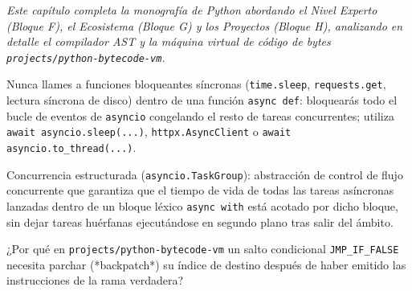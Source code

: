 \documentclass{book}
\begin{document}
\noindent\textit{Este capítulo completa la monografía de Python abordando el Nivel Experto (Bloque F), el Ecosistema (Bloque G) y los Proyectos (Bloque H), analizando en detalle el compilador AST y la máquina virtual de código de bytes \texttt{projects/python-bytecode-vm}.}

\begin{tcolorbox}[title={Consejo}, studiumtip, breakable]

Nunca llames a funciones bloqueantes síncronas (\texttt{time.sleep}, \texttt{requests.get}, lectura síncrona de disco) dentro de una función \texttt{async def}: bloquearás todo el bucle de eventos de \texttt{asyncio} congelando el resto de tareas concurrentes; utiliza \texttt{await asyncio.sleep(...)}, \texttt{httpx.AsyncClient} o \texttt{await asyncio.to\_thread(...)}.
\end{tcolorbox}

\begin{tcolorbox}[title={Definición}, studiumdef, breakable]

Concurrencia estructurada (\texttt{asyncio.TaskGroup}): abstracción de control de flujo concurrente que garantiza que el tiempo de vida de todas las tareas asíncronas lanzadas dentro de un bloque léxico \texttt{async with} está acotado por dicho bloque, sin dejar tareas huérfanas ejecutándose en segundo plano tras salir del ámbito.
\end{tcolorbox}

\begin{tcolorbox}[title={Autoficha}, studiumcheck, breakable]

¿Por qué en \texttt{projects/python-bytecode-vm} un salto condicional \texttt{JMP\_IF\_FALSE} necesita parchar (*backpatch*) su índice de destino después de haber emitido las instrucciones de la rama verdadera?
\end{tcolorbox}
\end{document}
